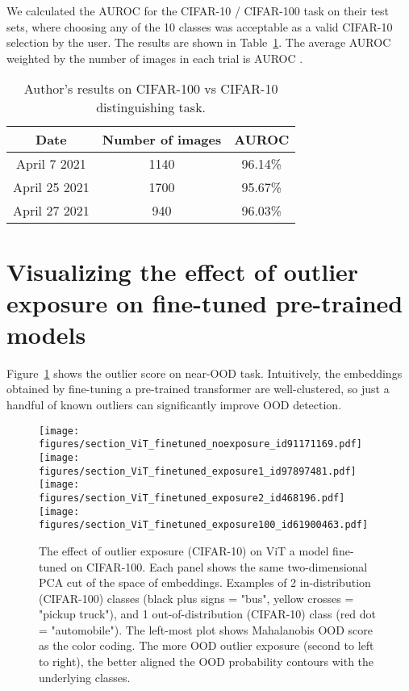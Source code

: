 \documentclass{article}
\begin{document}
We calculated the AUROC for the CIFAR-10 / CIFAR-100 task on their test sets, where choosing any of the 10 classes was acceptable as a valid CIFAR-10 selection by the user. The results are shown in Table~\ref{tab:human-benchmark}. The average AUROC weighted by the number of images in each trial is AUROC . 
\begin{table}[h]
\begin{center}	
\caption{Author's results on CIFAR-100 vs CIFAR-10 distinguishing task.}
\begin{tabular}{ c|c|c } 
	Date & Number of images & AUROC \\
	\hline
	April 7 2021 & 1140 & 96.14\% \\
	April 25 2021 & 1700 & 95.67\% \\
	April 27 2021 & 940 & 96.03\% \\ \hline
\end{tabular}
\label{tab:human-benchmark}
\end{center}
\end{table}

\section{Visualizing the effect of outlier exposure on fine-tuned pre-trained models}\label{sec:outlier:exposure:landscape}
Figure~\ref{fig:outlier_exposure_landscape_cuts} shows the outlier score on near-OOD task.  
Intuitively, the embeddings obtained by fine-tuning a pre-trained transformer are well-clustered, so just a handful of known outliers can significantly improve OOD detection. 

\begin{figure}[ht]
	\centering
	\texttt{[image: figures/section\_ViT\_finetuned\_noexposure\_id91171169.pdf]}
	\texttt{[image: figures/section\_ViT\_finetuned\_exposure1\_id97897481.pdf]}
	\texttt{[image: figures/section\_ViT\_finetuned\_exposure2\_id468196.pdf]}
	\texttt{[image: figures/section\_ViT\_finetuned\_exposure100\_id61900463.pdf]}
\caption{The effect of outlier exposure (CIFAR-10) on ViT a model fine-tuned on CIFAR-100. Each panel shows the same two-dimensional PCA cut of the space of embeddings. Examples of 2 in-distribution (CIFAR-100) classes (black plus signs = "bus", yellow crosses = "pickup truck"), and 1 out-of-distribution (CIFAR-10) class (red dot = "automobile"). The left-most plot shows Mahalanobis OOD score as the color coding. The more OOD outlier exposure (second to left to right), the better aligned the OOD probability contours with the underlying classes. 
	}
	\label{fig:outlier_exposure_landscape_cuts}
\end{figure}
\end{document}
